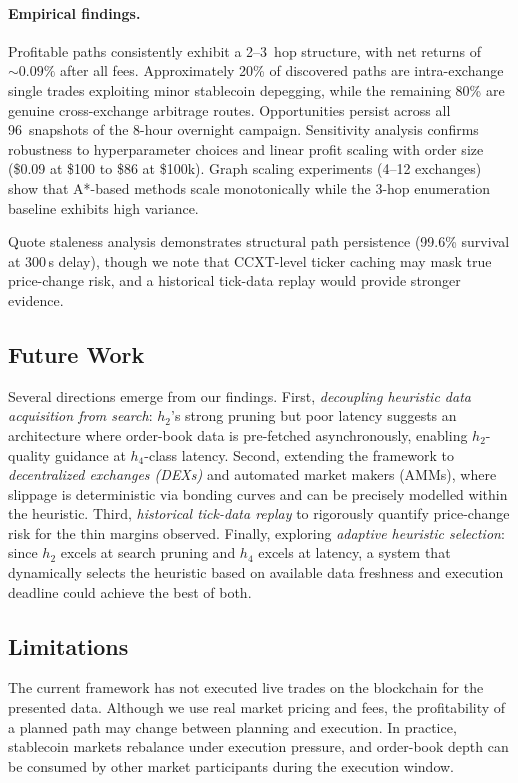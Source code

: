 \paragraph{Empirical findings.}
Profitable paths consistently exhibit a 2--3~hop structure, with net returns of ${\sim}0.09\%$ after all fees. Approximately 20\% of discovered paths are intra-exchange single trades exploiting minor stablecoin depegging, while the remaining 80\% are genuine cross-exchange arbitrage routes. Opportunities persist across all 96~snapshots of the 8-hour overnight campaign. Sensitivity analysis confirms robustness to hyperparameter choices and linear profit scaling with order size (\$0.09 at \$100 to \$86 at \$100k). Graph scaling experiments (4--12 exchanges) show that A*-based methods scale monotonically while the 3-hop enumeration baseline exhibits high variance.

Quote staleness analysis demonstrates structural path persistence (99.6\% survival at 300\,s delay), though we note that CCXT-level ticker caching may mask true price-change risk, and a historical tick-data replay would provide stronger evidence.

\subsection{Future Work}

Several directions emerge from our findings. First, \emph{decoupling heuristic data acquisition from search}: $h_2$'s strong pruning but poor latency suggests an architecture where order-book data is pre-fetched asynchronously, enabling $h_2$-quality guidance at $h_4$-class latency. Second, extending the framework to \emph{decentralized exchanges (DEXs)} and automated market makers (AMMs), where slippage is deterministic via bonding curves and can be precisely modelled within the heuristic. Third, \emph{historical tick-data replay} to rigorously quantify price-change risk for the thin margins observed. Finally, exploring \emph{adaptive heuristic selection}: since $h_2$ excels at search pruning and $h_4$ excels at latency, a system that dynamically selects the heuristic based on available data freshness and execution deadline could achieve the best of both.

\subsection{Limitations}

The current framework has not executed live trades on the blockchain for the presented data. Although we use real market pricing and fees, the profitability of a planned path may change between planning and execution. In practice, stablecoin markets rebalance under execution pressure, and order-book depth can be consumed by other market participants during the execution window.

